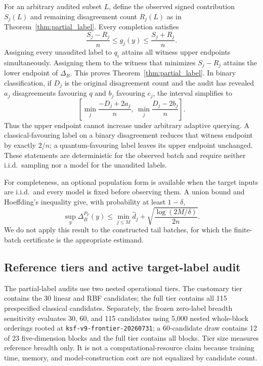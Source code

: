 \documentclass[referee,lineno,pdflatex,sn-vancouver-num]{sn-jnl}
\theoremstyle{thmstyleone}%
\theoremstyle{thmstyletwo}%
\theoremstyle{thmstylethree}%
\begin{document}
For an arbitrary audited subset $L$, define the observed signed contribution $S_j(L)$ and remaining disagreement count $R_j(L)$ as in Theorem~\ref{thm:partial_label}. Every completion satisfies
\[
\frac{S_j-R_j}{n}\leq g_j(y)\leq\frac{S_j+R_j}{n}.
\]
Assigning every unaudited label to $q_i$ attains all witness upper endpoints simultaneously. Assigning them to the witness that minimizes $S_j-R_j$ attains the lower endpoint of $\Delta_B$. This proves Theorem~\ref{thm:partial_label}. In binary classification, if $D_j$ is the original disagreement count and the audit has revealed $a_j$ disagreements favouring $q$ and $b_j$ favouring $c_j$, the interval simplifies to
\[
\left[
\min_j\frac{-D_j+2a_j}{n},\
\min_j\frac{D_j-2b_j}{n}
\right].
\]
Thus the upper endpoint cannot increase under arbitrary adaptive querying. A classical-favouring label on a binary disagreement reduces that witness endpoint by exactly $2/n$; a quantum-favouring label leaves its upper endpoint unchanged. These statements are deterministic for the observed batch and require neither i.i.d.\ sampling nor a model for the unaudited labels.

For completeness, an optional population form is available when the target inputs are i.i.d.\ and every model is fixed before observing them. A union bound and Hoeffding's inequality give, with probability at least $1-\delta$,
\[
\sup_y\Delta_B^{P_T}(y)
\leq \min_{j\leq M}\widehat d_j+
\sqrt{\frac{\log(2M/\delta)}{2n}}.
\]
We do not apply this result to the constructed tail batches, for which the finite-batch certificate is the appropriate estimand.

\subsection{Reference tiers and active target-label audit}
\label{sec:methods_frontier}

The partial-label audits use two nested operational tiers. The customary tier contains the 30 linear and RBF candidates; the full tier contains all 115 prespecified classical candidates. Separately, the frozen zero-label breadth sensitivity evaluates 30, 60, and 115 candidates using 5,000 nested whole-block orderings rooted at \texttt{ksf-v9-frontier-20260731}; a 60-candidate draw contains 12 of 23 five-dimension blocks and the full tier contains all blocks. Tier size measures reference breadth only. It is not a computational-resource claim because training time, memory, and model-construction cost are not equalized by candidate count.
\end{document}

